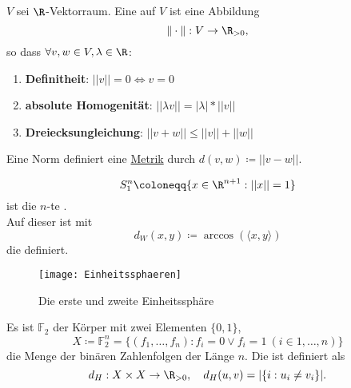 \begin{example}\label{bsp:norm}
  \( V \) sei \( \R \)-Vektorraum. Eine  auf \( V \) ist eine Abbildung 
  \begin{equation*}
    \Vert\cdot\Vert : V \to \R_{>0}\text{,}
  \end{equation*}
  so dass \( \forall v, w \in V, \lambda \in \R \):
  \begin{enumerate}
    \item \textbf{Definitheit}: \( ||v|| = 0 \Leftrightarrow v = 0 \)
    \item \textbf{absolute Homogenität}: \( ||\lambda v|| = |\lambda| * ||v|| \)
    \item \textbf{Dreiecksungleichung}: \( ||v+w|| \leq ||v||+||w|| \)
  \end{enumerate}
  Eine Norm definiert eine \hyperref[def:metrik]{Metrik} durch \( d(v, w) \coloneqq ||v-w|| \).
\end{example}

\begin{example}[Einheitssphäre]\label{bsp:einheitssphaere}
  \begin{equation*}
    S_1^n \coloneqq \{ x \in \R^{n+1} : ||x|| = 1 \}
  \end{equation*}
  ist die \( n \)-te . \\
  Auf dieser ist mit
  \begin{equation*}
     d_W(x, y) \coloneqq \arccos(\langle x, y \rangle)
  \end{equation*}
  die  definiert.

  \begin{figure}[H]
    \texttt{[image: Einheitssphaeren]}
    \caption{Die erste und zweite Einheitssphäre}
  \end{figure}
\end{example}

\begin{example}
  Es ist \( \mathbb{F}_2 \) der Körper mit zwei Elementen \( \{ 0, 1 \} \),
  \begin{equation*}
    X \coloneqq \mathbb{F}_2^n = \{ (f_1, \dots, f_n) : f_i = 0 \vee f_i = 1 \ (i \in {1, \dots, n}) \}
  \end{equation*}
  die Menge der binären Zahlenfolgen der Länge \( n \). Die  ist definiert als
  \begin{equation*}
    d_H: X \times X \to \R_{>0}, \quad d_H(u,v) = |\{ i : u_i \neq v_i \}|\text{.}
  \end{equation*}
\end{example}